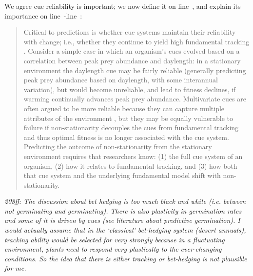 \documentclass[11pt,letterpaper]{article}
\newcommand{\lr}[1]{line~\lineref{#1}}
\begin{document}
We agree cue reliability is important; we now define it on \lr{definecue}, and explain its importance on \lr{cuereliable}-\lr{r3birdsE}:
\begin{quote}
Critical to predictions is whether  cue systems maintain their reliability with change; i.e., whether they continue to yield high fundamental tracking \citep{bonamour2019}. Consider a simple case in which an organism's cues evolved based on a correlation between peak prey abundance and daylength: in a stationary environment the daylength cue may be fairly reliable (generally predicting peak prey abundance based on daylength, with some interannual variation), but would become unreliable, and lead to fitness declines, if warming continually advances peak prey abundance. Multivariate cues are often argued to be more reliable because they can capture multiple attributes of the environment \citep{dore2018,bonamour2019}, but they may be equally vulnerable to failure if non-stationarity decouples the cues from fundamental tracking \citep{bonamour2019} and thus optimal fitness is no longer associated with the cue system. Predicting the outcome of non-stationarity from the stationary environment requires that researchers know: (1) the full cue system of an organism, (2) how it relates to fundamental tracking, and (3) how both that cue system and the underlying fundamental model shift with non-stationarity.
\end{quote}

\emph{208ff: The discussion about bet hedging is too much black and white (i.e. between not
germinating and germinating). There is also plasticity in germination rates and some of it is
driven by cues (see literature about predictive germination). I would actually assume that in
the `classical' bet-hedging system (desert annuals), tracking ability would be selected for
very strongly because in a fluctuating environment, plants need to respond very plastically
to the ever-changing conditions. So the idea that there is either tracking or bet-hedging is
not plausible for me.}\\
\end{document}
